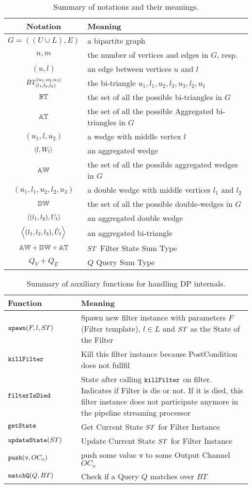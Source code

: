 \begin{table}[ht]
\centering
\begin{tabular}{|c|l|} \hline
\textbf{Notation} & \textbf{Meaning}\\ \hline
$G=((U\cup L),E)$ & a bipartite graph\\  \hline
$n,m$ & the number of vertices and edges in $G$, resp.\\  \hline
$(u,l)$ & an edge between vertices $u$ and $l$\\  \hline
$BT_{(l_1, l_2,l_3)}^{(u_1, u_2, u_3)}$ & the bi-triangle $u_1,l_1,u_2,l_3,u_3,l_2,u_1$\\  \hline
$\mathbb{BT}$ & the set of all the possible bi-triangles in $G$ \\  \hline
$\mathbb{AT}$ & the set of all the possible Aggregated bi-triangles in $G$ \\  \hline
$(u_1,l,u_2)$ & a wedge with  middle vertex $l$\\  \hline
$\left\langle l, W_l \right\rangle$ & an aggregated wedge\\  \hline
$\mathbb{AW}$ & the set of all the possible aggregated wedges in $G$\\  \hline
$(u_1,l_1,u_2,l_2,u_3)$ & a double wedge with middle vertices $l_1$ and $l_2$\\  \hline 
$\mathbb{DW}$ & the set of all the possible double-wedges in $G$\\  \hline
$\left\langle (l_1, l_2), U_t \right\rangle$ & an aggregated double wedge\\  \hline
$\left\langle (l_1, l_2,l_3), \hat{U}_t \right\rangle$ & an aggregated bi-triangle\\  \hline
$\mathbb{AW} + \mathbb{DW} + \mathbb{AT}$ & $ST$ Filter State Sum Type\\  \hline
$Q_V + Q_E$ & $Q$ Query Sum Type\\  \hline
\end{tabular}
\caption{Summary of notations and their meanings.}
\label{table:notation}
\end{table}
%      
\begin{table}[ht]
\centering
\begin{tabular}{|p{0.3\linewidth}|p{0.7\linewidth}|} \hline
\textbf{Function} & \textbf{Meaning}\\ \hline
$\mathtt{spawn}(F,l,ST)$ & Spawn new filter instance with parameters $F$ (Filter template), $l \in L$ and $ST$ as the State of the Filter\\\hline
$\mathtt{killFilter}$ & Kill this filter instance because PostCondition does not fullfil\\ \hline
$\mathtt{filterIsDied}$ & State after calling $\mathtt{killFilter}$ on filter. Indicates if Filter is die or not. If it is died, this filter instance does not participate anymore in the pipeline streaming processor\\ \hline
$\mathtt{getState}$ & Get Current State $ST$ for Filter Instance \\ \hline
$\mathtt{updateState}(ST)$ & Update Current State $ST$ for Filter Instance \\ \hline
$\mathtt{push}(\mathtt{v}, OC_x)$ & push some value $\mathtt{v}$ to some Output Channel $OC_x$ \\\hline
$\mathtt{matchQ}(Q, BT)$ & Check if a Query $Q$ matches over $BT$ \\ \hline
\end{tabular}
\caption{Summary of auxiliary functions for handling DP internals.}
\label{table:aux:fn}
\end{table}
